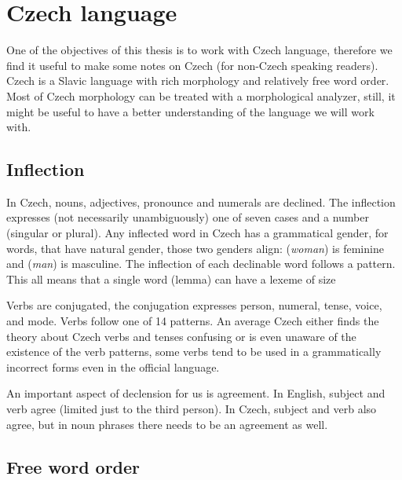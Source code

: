 \section{Czech language}
One of the objectives of this thesis is to work with Czech language, therefore we find it useful to make some notes on Czech (for non-Czech speaking readers). Czech is a Slavic language with rich morphology and relatively free word order. Most of Czech morphology can be treated with a morphological analyzer, still, it might be useful to have a better understanding of the language we will work with.

\subsection{Inflection}
In Czech, nouns, adjectives, pronounce and numerals are declined. The inflection expresses (not necessarily unambiguously) one of seven cases and a number (singular or plural). Any inflected word in Czech has a grammatical gender, for words, that have natural gender, those two genders align:  (\textit{woman}) is feminine and  (\textit{man}) is masculine. The inflection of each declinable word follows a pattern. This all means that a single word (lemma) can have a lexeme of size 

Verbs are conjugated, the conjugation expresses person, numeral, tense, voice, and mode. Verbs follow one of 14 patterns. An average Czech either finds the theory about Czech verbs and tenses confusing or is even unaware of the existence of the verb patterns, some verbs tend to be used in a grammatically incorrect forms even in the official language.

An important aspect of declension for us is agreement. In English, subject and verb agree (limited just to the third person). In Czech, subject and verb also agree, but in noun phrases there needs to be an agreement as well.  

\subsection{Free word order}

